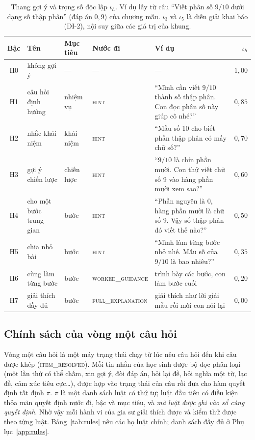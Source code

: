 \begin{table}[tp]
\centering
\caption{Thang gợi ý và trọng số độc lập $\iota_h$. Ví dụ lấy từ câu ``Viết phân số $9/10$ dưới dạng số thập phân'' (đáp án $0{,}9$) của chương mẫu. $\iota_3$ và $\iota_5$ là diễn giải khai báo (DI-2), nội suy giữa các giá trị của khung.}
\label{tab:ladder}
\small
\begin{tabularx}{\linewidth}{@{}clllYr@{}}
\toprule
Bậc & Tên & Mục tiêu & Nước đi & Ví dụ & $\iota_h$ \\
\midrule
H0 & không gợi ý & --- & --- & --- & $1{,}00$ \\
H1 & câu hỏi định hướng & nhiệm vụ & \textsc{hint} & ``Mình cần viết $9/10$ thành số thập phân. Con đọc phân số này giúp cô nhé?'' & $0{,}85$ \\
H2 & nhắc khái niệm & khái niệm & \textsc{hint} & ``Mẫu số 10 cho biết phần thập phân có mấy chữ số?'' & $0{,}70$ \\
H3 & gợi ý chiến lược & chiến lược & \textsc{hint} & ``$9/10$ là chín phần mười. Con thử viết chữ số 9 vào hàng phần mười xem sao?'' & $0{,}60$ \\
H4 & cho một bước trung gian & bước & \textsc{hint} & ``Phần nguyên là 0, hàng phần mười là chữ số 9. Vậy số thập phân đó viết thế nào?'' & $0{,}50$ \\
H5 & chia nhỏ bài & bước & \textsc{hint} & ``Mình làm từng bước nhỏ nhé. Mẫu số của $9/10$ là bao nhiêu?'' & $0{,}35$ \\
H6 & cùng làm từng bước & bước & \textsc{worked\_guidance} & trình bày các bước, con làm bước cuối & $0{,}20$ \\
H7 & giải thích đầy đủ & bước & \textsc{full\_explanation} & giải thích như lời giải mẫu rồi mời con nói lại & $0{,}00$ \\
\bottomrule
\end{tabularx}
\end{table}

\subsection{Chính sách của vòng một câu hỏi}
Vòng một câu hỏi là một máy trạng thái chạy từ lúc nêu câu hỏi đến khi câu được khép (\textsc{item\_resolved}). Mỗi tin nhắn của học sinh được bộ đọc phân loại (một lần thử có thể chấm, xin gợi ý, đòi đáp án, hỏi lại đề, hỏi nghĩa một từ, lạc đề, cảm xúc tiêu cực\dots), được hợp vào trạng thái của câu rồi đưa cho hàm quyết định tất định $\pi$. $\pi$ là một danh sách luật có thứ tự; luật đầu tiên có điều kiện thỏa mãn quyết định nước đi, bậc và mục tiêu, và \emph{mã luật được ghi vào sổ cùng quyết định}. Nhờ vậy mỗi hành vi của gia sư giải thích được và kiểm thử được theo từng luật. Bảng~\ref{tab:rules} nêu các họ luật chính; danh sách đầy đủ ở Phụ lục~\ref{app:rules}.


